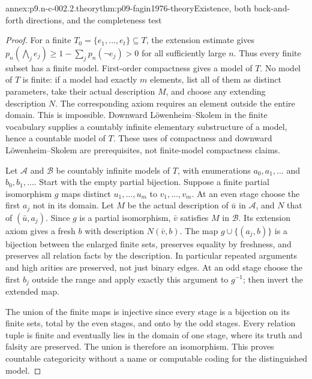 \begin{annexitem}{annex:p9.n-c-002.2.theory}{thm:p09-fagin1976-theory}{Existence, both back-and-forth directions, and the completeness test}
\begin{proof}
For a finite \(T_0=\{e_1,\ldots,e_t\}\subseteq T\), the extension
estimate gives
\(p_n(\bigwedge_j e_j)\geq1-\sum_jp_n(\neg e_j)>0\)
for all sufficiently large \(n\).  Thus every finite subset has a
finite model.  First-order compactness gives a model of \(T\).
No model of \(T\) is finite: if a model had exactly \(m\) elements,
list all of them as distinct parameters, take their actual description
\(M\), and choose any extending description \(N\).  The corresponding
axiom requires an element outside the entire domain.  This is impossible.
Downward L\"owenheim--Skolem in the finite vocabulary supplies a countably
infinite elementary substructure of a model, hence a countable model of
\(T\).  These uses of compactness and downward L\"owenheim--Skolem
are prerequisites, not finite-model compactness claims.

Let \(\mathcal A\) and \(\mathcal B\) be countably infinite models of \(T\), with
enumerations \(a_0,a_1,\ldots\) and \(b_0,b_1,\ldots\).
Start with the empty partial bijection.  Suppose a finite partial
isomorphism \(g\) maps distinct \(u_1,\ldots,u_m\) to
\(v_1,\ldots,v_m\).  At an even stage choose the first \(a_j\)
not in its domain.  Let \(M\) be the actual description of
\(\bar u\) in \(\mathcal A\), and \(N\) that of
\((\bar u,a_j)\).  Since \(g\) is a partial isomorphism,
\(\bar v\) satisfies \(M\) in \(\mathcal B\).  Its extension
axiom gives a fresh \(b\) with description \(N(\bar v,b)\).
The map \(g\cup\{(a_j,b)\}\) is a bijection between the enlarged
finite sets, preserves equality by freshness, and preserves all relation
facts by the description.  In particular repeated arguments and high
arities are preserved, not just binary edges.  At an odd stage choose the
first \(b_j\) outside the range and apply exactly this argument to
\(g^{-1}\); then invert the extended map.

The union of the finite maps is injective since every stage is a
bijection on its finite sets, total by the even stages, and onto by the
odd stages.  Every relation tuple is finite and eventually lies in the
domain of one stage, where its truth and falsity are preserved.  The
union is therefore an isomorphism.  This proves countable categoricity
without a name or computable coding for the distinguished model.


\end{proof}
\end{annexitem}
